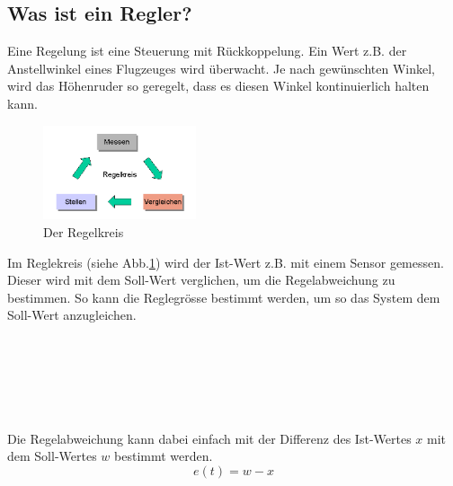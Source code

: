 \documentclass[12pt,a4paper, ngerman]{article}
\begin{document}
\subsection{Was ist ein Regler?}
Eine Regelung ist eine Steuerung mit Rückkoppelung.\cite{website:rn-wissen_Regelungstechnik} Ein Wert z.B. der Anstellwinkel eines Flugzeuges wird überwacht. Je nach gewünschten Winkel, wird das Höhenruder so geregelt, dass es diesen Winkel kontinuierlich halten kann.\\
\begin{figure}
\centering
\includegraphics[width=0.4\textwidth]{Regelkreis1.png}
\caption[\url{https://rn-wissen.de/wiki/images/2/25/Regelkreis1.png}]{Der Regelkreis}\label{regkreis}
\end{figure}
Im Reglekreis (siehe Abb.\ref{regkreis}) wird der Ist-Wert z.B. mit einem Sensor gemessen. Dieser wird mit dem Soll-Wert verglichen, um die Regelabweichung zu bestimmen. So kann die Reglegrösse bestimmt werden, um so das System dem Soll-Wert anzugleichen.\cite{website:rn-wissen_Regelungstechnik}\\ \\ \\ \\ \\ \\ \\
Die Regelabweichung kann dabei einfach mit der Differenz des Ist-Wertes $x$ mit dem Soll-Wertes $w$ bestimmt werden.\cite{website:rn-wissen_Regelungstechnik}
\begin{equation}
e(t)=w-x
\end{equation}\\
\end{document}

